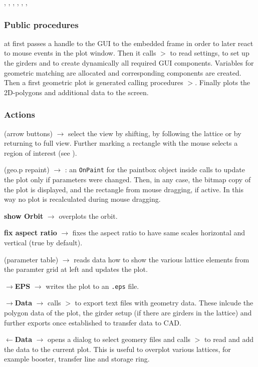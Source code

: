 \documentclass[12pt]{article}
\newcommand\code[1]{{\tt #1}}
\newcommand{\ofld}[1]{\colorbox{black!15}{{{\color{black}\bf #1}}}}
\newcommand{\ofldx}[1]{\colorbox{black!15}{{\color{black}(#1)}}}
\newcommand\guico[1]{{\color{blue}\code{#1}}}
\newcommand\guifco[1]{{\color{violet}\code{#1}}}
\newcommand{\unico}[1]{{\color{burntorange}\code{#1}}}
\newcommand{\evcod}[2]{\ofld{#1} $\rightarrow$ \guico{#2}}
\newcommand{\evcodx}[2]{\ofldx{#1} $\rightarrow$ \guico{#2}}
\newcommand{\prcod}[2]{\opauni{#1}$>$\unico{#2}}
\newcommand{\opaguif}[1]{\colorbox{violet!30}{{\color{black}\code{#1}}}}
\newcommand{\oguif}[1]{\hyperref[#1]{\opaguif{#1}}}
\newcommand{\opauni}[1]{\colorbox{orange!30}{{\color{black}\code{#1}}}}
\newcommand{\ouni}[1]{\hyperref[#1]{\opauni{#1}}}
\newcommand{\uses}[1]{\flushleft {\bf Uses:} #1}
\newcommand{\act}[1]{\subsubsection*{Actions} #1}
\newcommand{\ppro}[1]{\subsubsection*{Public procedures} #1}
\begin{document}
\uses{\ouni{globlib}, \ouni{varlib}, \ouni{georblib}, \ouni{linoplib}, \ouni{mathlib}, \oguif{comfigureframe}, \ouni{comauxlib}}

\ppro{
\guico{Start} at first passes a handle to the GUI to the embedded \oguif{comfigureframe} frame \guico{geo} in order to later react to mouse events in the plot window. Then it calls \prcod{georblib}{GeoInit} to read settings, to set up the girders and to create dynamically all required GUI components. Variables for geometric matching are allocated and corresponding components are created. Then a first geometric plot is generated calling procedures \prcod{georblib}{CalcOrbit,CalcFaces,TransPoly,GeoMinMax}. Finally
\guico{MakePlot} plots the 2D-polygons and additional data to the screen. 
}


\act{}
\evcodx{arrow buttons}{but(Left,Right,Up,Down,SForward,SBackward,ZoomFull)Click} select the view by shifting, by following the lattice or by returning to full view. Further marking a rectangle with the mouse selects a region of interest (see \oguif{comfigureframe}).

\evcodx{geo.p repaint}{geopPaint}: an \code{OnPaint} for the paintbox object \guifco{p} inside \guifco{geo} calls \guico{MakePlot} to update the plot only if parameters were changed. Then, in any case, the bitmap copy of the plot is displayed, and the rectangle from mouse dragging, if active. In this way no plot is recalculated during mouse dragging.

\evcod{show Orbit}{chkOrbitClick} overplots the orbit.

\evcod{fix aspect ratio}{chkAspratClick} fixes the aspect ratio to have same scales horizontal and vertical (true by default).

\evcodx{parameter table}{GridParamKeyPressed} reads data how to show the various lattice elements from the paramter grid at left and updates the plot.

\evcod{$\longrightarrow$EPS}{butepsClick} writes the plot to an \code{.eps} file.

\evcod{$\longrightarrow$Data}{butListClick} calls \prcod{georblib}{WriteGEoFiles} to export text files with geometry data. These inlcude the polygon data of the plot, the girder setup (if there are girders in the lattice) and further exports once established to transfer data to CAD.

\evcod{$\longleftarrow$Data}{butListClick} opens a dialog to select geomery files and calls \prcod{georblib}{ReadGeoFiles} to read and add the data to the current plot. This is useful to overplot various lattices, for example booster, transfer line and storage ring.
\end{document}
